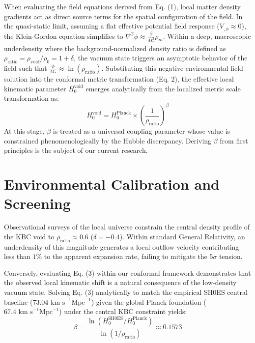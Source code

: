 \documentclass[aps,prl,reprint,superscriptaddress,nofootinbib,amsmath,amssymb]{revtex4-2}
\begin{document}
When evaluating the field equations derived from Eq. (1), local matter density gradients act as direct source terms for the spatial configuration of the field. In the quasi-static limit, assuming a flat effective potential field response ($V_{,\phi} \approx 0$), the Klein-Gordon equation simplifies to $\nabla^2\phi \approx \frac{\beta}{M_*^3}\rho_m$. Within a deep, macroscopic underdensity where the background-normalized density ratio is defined as $\rho_{\text{ratio}} = \rho_{\text{void}}/\rho_0 = 1 + \delta$, the vacuum state triggers an asymptotic behavior of the field such that $\frac{\phi}{M_*} \approx \ln(\rho_{\text{ratio}})$. Substituting this negative environmental field solution into the conformal metric transformation (Eq. 2), the effective local kinematic parameter $H_0^{\text{void}}$ emerges analytically from the localized metric scale transformation as:
\begin{equation}
H_0^{\text{void}} = H_0^{\text{Planck}} \times \left( \frac{1}{\rho_{\text{ratio}}} \right)^\beta
\end{equation}
At this stage, $\beta$ is treated as a universal coupling parameter whose value is constrained phenomenologically by the Hubble discrepancy. Deriving $\beta$ from first principles is the subject of our current research.



\section{Environmental Calibration and Screening}
Observational surveys of the local universe constrain the central density profile of the KBC void to \mbox{$\rho_{\text{ratio}} \approx 0.6$} ($\delta = -0.4$). Within standard General Relativity, an underdensity of this magnitude generates a local outflow velocity contributing less than $1\%$ to the apparent expansion rate, failing to mitigate the $5\sigma$ tension. 

Conversely, evaluating Eq. (3) within our conformal framework demonstrates that the observed local kinematic shift is a natural consequence of the low-density vacuum state. Solving Eq. (3) analytically to match the empirical SH0ES central baseline ($73.04 \text{ km s}^{-1}\text{Mpc}^{-1}$) given the global Planck foundation ($67.4 \text{ km s}^{-1}\text{Mpc}^{-1}$) under the central KBC constraint yields:
\begin{equation}
\beta = \frac{\ln(H_0^{\mathrm{SH0ES}} / H_0^{\mathrm{Planck}})}{\ln(1 / \rho_{\text{ratio}})} \approx 0.1573
\end{equation}
\end{document}
